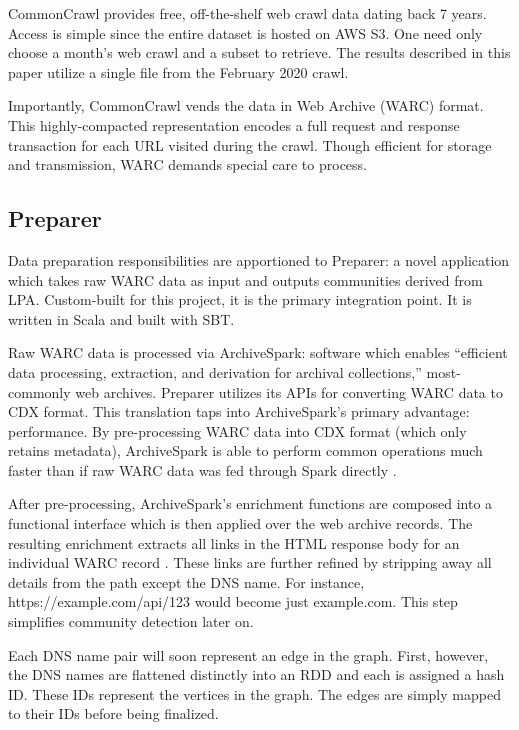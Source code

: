 \documentclass[conference]{IEEEtran}
\begin{document}
CommonCrawl provides free, off-the-shelf web crawl data dating back 7 years. Access is simple since the entire dataset is hosted on AWS S3. One need only choose a month's web crawl and a subset to retrieve. The results described in this paper utilize a single file from the February 2020 crawl.

Importantly, CommonCrawl vends the data in Web Archive (WARC) format. This highly-compacted representation encodes a full request and response transaction for each URL visited during the crawl. Though efficient for storage and transmission, WARC demands special care to process.

\subsection{Preparer}

Data preparation responsibilities are apportioned to Preparer: a novel application which takes raw WARC data as input and outputs communities derived from LPA. Custom-built for this project, it is the primary integration point. It is written in Scala and built with SBT.

Raw WARC data is processed via ArchiveSpark: software which enables ``efficient data processing, extraction, and derivation for archival collections,''\cite{archiveSpark} most-commonly web archives. Preparer utilizes its APIs for converting WARC data to CDX format. This translation taps into ArchiveSpark's primary advantage: performance. By pre-processing WARC data into CDX format (which only retains metadata), ArchiveSpark is able to perform common operations much faster than if raw WARC data was fed through Spark directly \cite{generatingCdx}.

After pre-processing, ArchiveSpark's enrichment functions \cite{enrichmentFunctions} are composed into a functional interface which is then applied over the web archive records. The resulting enrichment extracts all links in the HTML response body for an individual WARC record \cite{linkExtraction}. These links are further refined by stripping away all details from the path except the DNS name. For instance, https://example.com/api/123 would become just example.com. This step simplifies community detection later on.

Each DNS name pair will soon represent an edge in the graph. First, however, the DNS names are flattened distinctly into an RDD and each is assigned a hash ID. These IDs represent the vertices in the graph. The edges are simply mapped to their IDs before being finalized.
\end{document}
